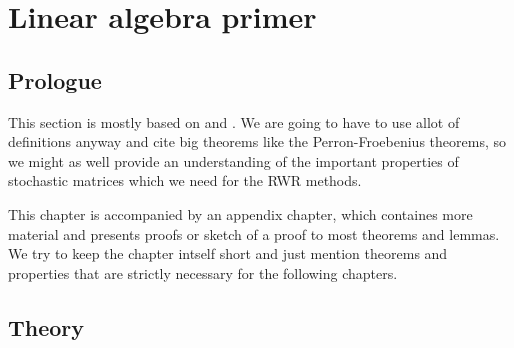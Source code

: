 \section{Linear algebra primer}

\subsection*{Prologue}
This section is mostly based on \cite{meyer2000matrix} and
\cite{herstein_winter_1989}. We are going to have to use allot of
definitions anyway and cite big theorems like the Perron-Froebenius
theorems, so we might as well provide an
understanding of the important properties of stochastic matrices
which we need for the RWR methods.

This chapter is accompanied by an appendix chapter, which containes
more material and presents proofs or sketch of a proof to most
theorems and lemmas.
We try to keep the chapter intself short and just mention theorems
and properties that are strictly necessary for the following
chapters.


\subsection*{Theory}

